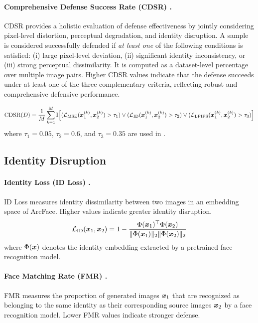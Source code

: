 \documentclass{article}
\begin{document}
\paragraph{Comprehensive Defense Success Rate (CDSR) .}
CDSR provides a holistic evaluation of defense effectiveness by jointly considering pixel-level distortion, perceptual degradation, and identity disruption. A sample is considered successfully defended if \emph{at least one} of the following conditions is satisfied: (i) large pixel-level deviation, (ii) significant identity inconsistency, or (iii) strong perceptual dissimilarity. It is computed as a dataset-level percentage over multiple image pairs. Higher CDSR values indicate that the defense succeeds under at least one of the three complementary criteria, reflecting robust and comprehensive defensive performance.

\begin{equation}
\mathrm{CDSR}(D) = \frac{1}{M} \sum_{k=1}^{M} \mathbb{I} \Big[ (\mathcal{L}_{\mathrm{MSE}}({\bm{x}}_1^{(k)},{\bm{x}}_2^{(k)}) > \tau_1) \lor (\mathcal{L}_{\mathrm{ID}}({\bm{x}}_1^{(k)},{\bm{x}}_2^{(k)}) > \tau_2) \lor (\mathcal{L}_\mathrm{LPIPS}({\bm{x}}_1^{(k)},{\bm{x}}_2^{(k)}) > \tau_3) \Big]
\label{eq:cdsr}
\end{equation}
\noindent where $\tau_1 = 0.05$, $\tau_2 = 0.6$, and $\tau_3 = 0.35$ are used in \cite{shim2025leat}.

\subsection{Identity Disruption}
\paragraph{Identity Loss (ID Loss) .}
ID Loss measures identity dissimilarity between two images in an embedding space of ArcFace. Higher values indicate greater identity disruption.
\begin{equation}
\mathcal{L}_{\mathrm{ID}}({\bm{x}}_1,{\bm{x}}_2) = 1 - \frac{\Phi({\bm{x}}_1)^\top \Phi({\bm{x}}_2)}{\|\Phi({\bm{x}}_1)\|_2 \|\Phi({\bm{x}}_2)\|_2}
\label{eq:id_loss}
\end{equation}
\noindent where $\Phi({\bm{x}})$ denotes the identity embedding extracted by a pretrained face recognition model.

\paragraph{Face Matching Rate (FMR) .}
FMR measures the proportion of generated images ${\bm{x}}_1$ that are recognized as belonging to the same identity as their corresponding source images ${\bm{x}}_2$ by a face recognition model. 
Lower FMR values indicate stronger defense.
\end{document}

